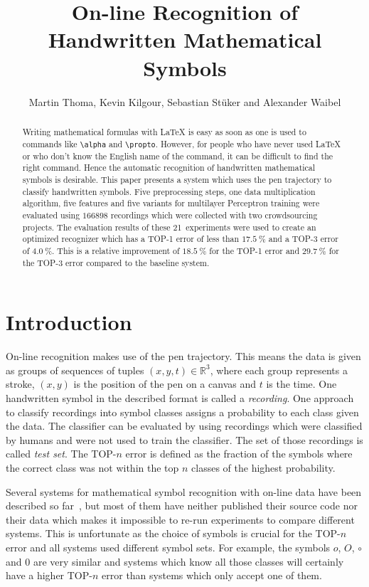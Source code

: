 \documentclass[9pt,technote]{IEEEtran}
\title{On-line Recognition of Handwritten Mathematical Symbols}
\author{Martin Thoma, Kevin Kilgour, Sebastian St{\"u}ker and Alexander Waibel}
\begin{document}
\maketitle
\begin{abstract}
Writing mathematical formulas with \LaTeX{} is easy as soon as one is used to
commands like \verb+\alpha+ and \verb+\propto+. However, for people who have
never used \LaTeX{} or who don't know the English name of the command, it can
be difficult to find the right command. Hence the automatic recognition of
handwritten mathematical symbols is desirable. This paper presents a system
which uses the pen trajectory to classify handwritten symbols. Five
preprocessing steps, one data multiplication algorithm, five features and five
variants for multilayer Perceptron training were evaluated using $\num{166898}$
recordings which were collected with two crowdsourcing projects. The evaluation
results of these 21~experiments were used to create an optimized recognizer
which has a TOP-1 error of less than $\SI{17.5}{\percent}$ and a TOP-3 error of
$\SI{4.0}{\percent}$. This is a relative improvement of $\SI{18.5}{\percent}$ for the
TOP-1 error and $\SI{29.7}{\percent}$ for the TOP-3 error compared to the
baseline system.
\end{abstract}

\section{Introduction}
On-line recognition makes use of the pen trajectory. This means the data is
given as groups of sequences of tuples $(x, y, t) \in \mathbb{R}^3$, where each
group represents a stroke, $(x, y)$ is the position of the pen on a canvas and
$t$ is the time. One handwritten symbol in the described format is called a
\textit{recording}. One approach to classify recordings into symbol classes
assigns a probability to each class given the data. The classifier can be
evaluated by using recordings which were classified by humans and were not used
to train the classifier. The set of those recordings is called \textit{test
set}. The TOP-$n$ error is defined as the fraction of the symbols where
the correct class was not within the top $n$ classes of the highest
probability.

Several systems for mathematical symbol recognition with on-line data have been
described so far~\cite{Kosmala98,Mouchere2013}, but most of them have neither
published their source code nor their data which makes it impossible to re-run
experiments to compare different systems. This is unfortunate as the choice of
symbols is crucial for the TOP-$n$ error and all systems used different symbol
sets. For example, the symbols $o$, $O$, $\circ$ and $0$ are very similar and
systems which know all those classes will certainly have a higher TOP-$n$ error
than systems which only accept one of them.
\end{document}
